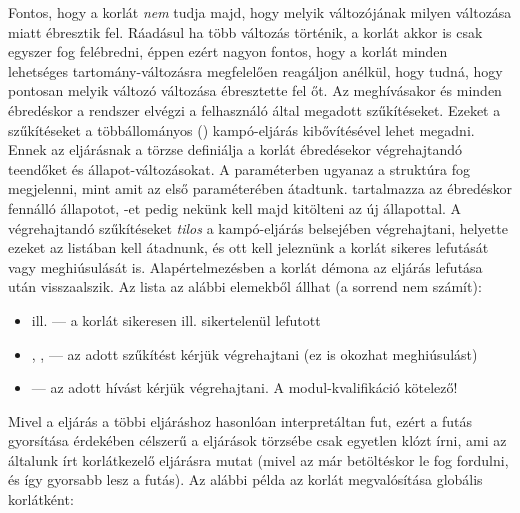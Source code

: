 Fontos, hogy a korlát \emph{nem} tudja majd, hogy melyik változójának milyen
változása miatt ébresztik fel. Ráadásul ha több változás történik, a korlát
akkor is csak egyszer fog felébredni, éppen ezért nagyon fontos, hogy a
korlát minden lehetséges tartomány-változásra megfelelően reagáljon anélkül,
hogy tudná, hogy pontosan melyik változó változása ébresztette fel őt.
\br
Az  meghívásakor és minden ébredéskor a rendszer elvégzi a
felhasználó által megadott szűkítéseket. Ezeket a szűkítéseket a
 többállományos () kampó-eljárás
kibővítésével lehet megadni.
\br
{}\\
Ennek az eljárásnak a törzse definiálja a  korlát ébredésekor
végrehajtandó teendőket és állapot-változásokat. A  paraméterben
ugyanaz a struktúra fog megjelenni, mint amit az  első
paraméterében átadtunk.  tartalmazza az ébredéskor fennálló állapotot,
-et pedig nekünk kell majd kitölteni az új állapottal. A végrehajtandó
szűkítéseket \emph{tilos} a kampó-eljárás belsejében végrehajtani, helyette ezeket
az  listában kell átadnunk, és ott kell jeleznünk a korlát sikeres
lefutását vagy meghiúsulását is. Alapértelmezésben a korlát démona az eljárás
lefutása után visszaalszik.
\br
Az  lista az alábbi elemekből állhat (a sorrend nem számít):

\begin{itemize}
\item {} ill.  --- a korlát sikeresen ill. sikertelenül lefutott
\item {}, ,  --- az adott szűkítést kérjük végrehajtani
(ez is okozhat meghiúsulást)
\item {} --- az adott hívást kérjük végrehajtani. A
 modul-kvalifikáció kötelező!
\end{itemize}

Mivel a  eljárás a többi  eljáráshoz hasonlóan
interpretáltan fut, ezért a futás gyorsítása érdekében célszerű a 
eljárások törzsébe csak egyetlen klózt írni, ami az általunk írt korlátkezelő eljárásra
mutat (mivel az már betöltéskor le fog fordulni, és így gyorsabb lesz a futás).
\br
Az alábbi példa az  korlát megvalósítása globális korlátként:

